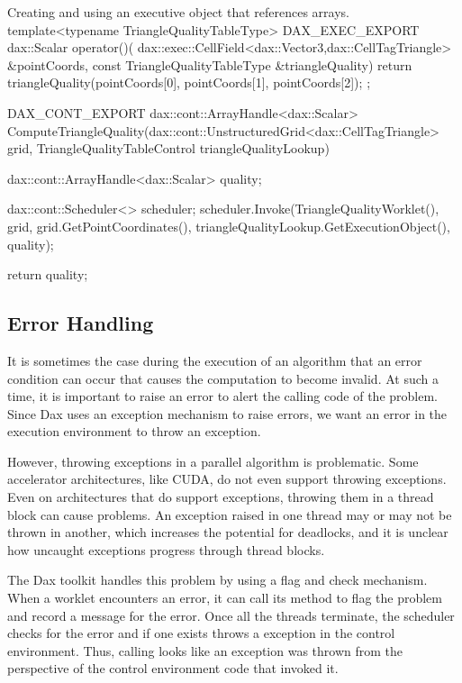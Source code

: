 \begin{daxexample}{Creating and using an executive object that references arrays.}
{  template<typename TriangleQualityTableType>
  DAX_EXEC_EXPORT
  dax::Scalar operator()(
      dax::exec::CellField<dax::Vector3,dax::CellTagTriangle> &pointCoords,
      const TriangleQualityTableType &triangleQuality)
  {
    return triangleQuality(pointCoords[0], pointCoords[1], pointCoords[2]);
  }
};

DAX_CONT_EXPORT
dax::cont::ArrayHandle<dax::Scalar>
ComputeTriangleQuality(dax::cont::UnstructuredGrid<dax::CellTagTriangle> grid,
                       TriangleQualityTableControl triangleQualityLookup)
{
  dax::cont::ArrayHandle<dax::Scalar> quality;

  dax::cont::Scheduler<> scheduler;
  scheduler.Invoke(TriangleQualityWorklet(),
                   grid,
                   grid.GetPointCoordinates(),
                   triangleQualityLookup.GetExecutionObject(),
                   quality);

  return quality;
}
\end{daxexample}



\subsection{Error Handling}
\label{sec:ErrorHandlingExecution}


It is sometimes the case during the execution of an algorithm that an error
condition can occur that causes the computation to become invalid. At such
a time, it is important to raise an error to alert the calling code of the
problem. Since Dax uses an exception mechanism to raise errors, we want an
error in the execution environment to throw an exception.

However, throwing exceptions in a parallel algorithm is problematic. Some
accelerator architectures, like CUDA, do not even support throwing
exceptions. Even on architectures that do support exceptions, throwing them
in a thread block can cause problems. An exception raised in one thread may
or may not be thrown in another, which increases the potential for
deadlocks, and it is unclear how uncaught exceptions progress through
thread blocks.

The Dax toolkit handles this problem by using a flag and check
mechanism. When a worklet encounters an error, it can call its
 method to flag the problem and record a message for
the error. Once all the threads terminate, the scheduler checks for the
error and if one exists throws a  exception in the
control environment. Thus, calling  looks like an
exception was thrown from the perspective of the control environment code
that invoked it.

